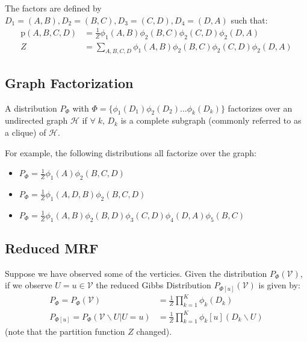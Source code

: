 \documentclass[11pt]{article}
\newcommand{\SetOf}[1]{\mathbf{#1}} %
\newcommand{\prob}[1]{\text{p}(#1)} %
\newcommand{\Eq}[1]{\begin{align*}#1\end{align*}} %
\newcommand{\cursive}[1]{\mathcal{#1}}
\begin{document}
	The factors are defined by $D_1 = (A,B), D_2 = (B,C), D_3 = (C,D), D_4 = (D,A)$ such that:
	\Eq{\prob{A,B,C,D} &= \frac{1}{Z}\phi_1(A,B)\phi_2(B,C)\phi_2(C,D)\phi_2(D,A)\\Z&=\sum_{A,B,C,D}\phi_1(A,B)\phi_2(B,C)\phi_2(C,D)\phi_2(D,A)}

	\subsection{Graph Factorization}

	A distribution $P_\Phi$ with $\Phi = \{\phi_1(D_1)\phi_2(D_2)...\phi_k(D_k) \}$ factorizes over an undirected graph $\cursive{H}$ if $\forall\;k$, $D_k$ is a complete subgraph (commonly referred to as a clique) of $\cursive{H}$.

	For example, the following distributions all factorize over the graph:

	\begin{center}
	\end{center}

	\begin{itemize}
		\item $P_\Phi = \frac{1}{Z}\phi_1(A)\phi_2(B,C,D)$ %
		\item $P_\Phi = \frac{1}{Z}\phi_1(A,D,B)\phi_2(B,C,D)$
		\item $P_\Phi = \frac{1}{Z}\phi_1(A,B)\phi_2(B,D)\phi_3(C,D)\phi_4(D,A)\phi_5(B,C)$
	\end{itemize}

	\subsection{Reduced MRF}
	Suppose we have observed some of the verticies. Given the distribution $P_\Phi(\cursive{V})$, if we observe $U=u \in \cursive{V}$ the reduced Gibbs Distribution $P_{\Phi[u]}(\cursive{V})$ is given by:
	\Eq{P_\Phi=P_\Phi(\cursive{V}) &=\frac{1}{Z}\prod_{k=1}^{K}\phi_k(D_k)\\P_{\Phi[u]}=P_{\Phi}(\cursive{V}\backslash U|U=u)&=\frac{1}{Z}\prod_{k=1}^{K}\phi_k[u](D_k\backslash U)}
	(note that the partition function $Z$ changed).
\end{document}
